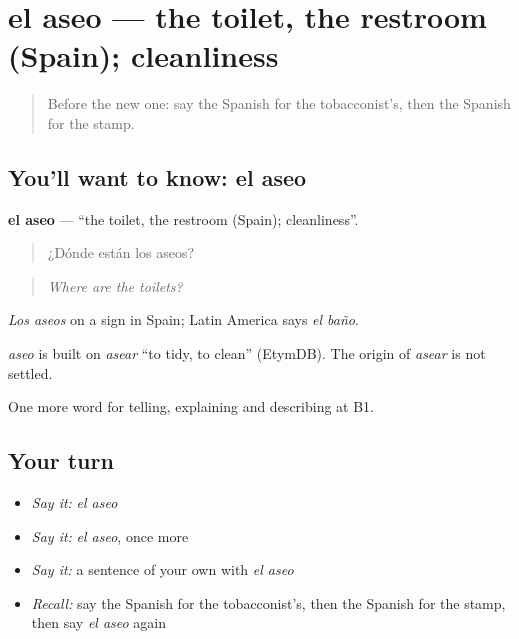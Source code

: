 \section[el aseo]{el aseo — the toilet, the restroom (Spain); cleanliness}

\label{lesson:ES-C679-aseo}



\begin{quote}
Before the new one: say the Spanish for the tobacconist’s, then the Spanish for the stamp.
\end{quote}

\subsection*{You'll want to know: el aseo}
\textbf{el aseo} — \textquotedblleft{}the toilet, the restroom (Spain); cleanliness\textquotedblright{}.

\begin{quote}
¿Dónde están los aseos?
\end{quote}

\begin{quote}
\emph{Where are the toilets?}
\end{quote}

\emph{Los aseos} on a sign in Spain; Latin America says \emph{el baño}.

\begin{cousinweb}
\emph{aseo} is built on \emph{asear} \textquotedblleft{}to tidy, to clean\textquotedblright{} (EtymDB). The origin of \emph{asear} is not settled.
\end{cousinweb}

\begin{grammarlens}[title={What you've built}]
One more word for telling, explaining and describing at B1.
\end{grammarlens}

\subsection*{Your turn}
\begin{itemize}
\raggedright
  \item \emph{Say it:} \emph{el aseo}
  \item \emph{Say it:} \emph{el aseo}, once more
  \item \emph{Say it:} a sentence of your own with \emph{el aseo}
  \item \emph{Recall:} say the Spanish for the tobacconist’s, then the Spanish for the stamp, then say \emph{el aseo} again
\end{itemize}

